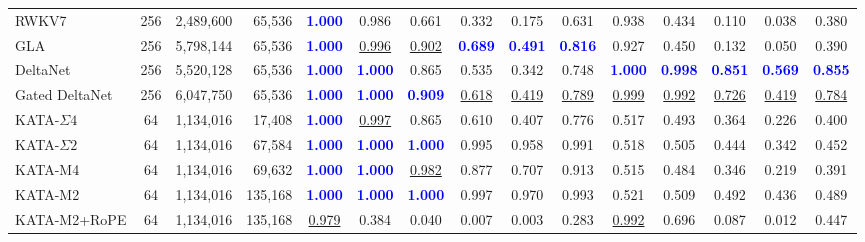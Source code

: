 \documentclass{article}
\newcommand{\1}{\bm{1}}
\theoremstyle{definition}
\begin{document}
\begin{table}[t]
\begin{tabular}{l|c|rr|cccccc|ccccc}
    \cmidrule(lr){1-13}
    RWKV7
      & 256 & 2{,}489{,}600 & 65{,}536
      & \textcolor{blue}{\textbf{1.000}} & 0.986 & 0.661 & 0.332 & 0.175 & 0.631
      & 0.938 & 0.434 & 0.110 & 0.038 & 0.380 \\
    GLA
      & 256 & 5{,}798{,}144 & 65{,}536
      & \textcolor{blue}{\textbf{1.000}} & \underline{0.996} & \underline{0.902} & \textcolor{blue}{\textbf{0.689}} & \textcolor{blue}{\textbf{0.491}} & \textcolor{blue}{\textbf{0.816}}
      & 0.927 & 0.450 & 0.132 & 0.050 & 0.390 \\
    DeltaNet
      & 256 & 5{,}520{,}128 & 65{,}536
      & \textcolor{blue}{\textbf{1.000}} & \textcolor{blue}{\textbf{1.000}} & 0.865 & 0.535 & 0.342 & 0.748
      & \textcolor{blue}{\textbf{1.000}} & \textcolor{blue}{\textbf{0.998}} & \textcolor{blue}{\textbf{0.851}} & \textcolor{blue}{\textbf{0.569}} & \textcolor{blue}{\textbf{0.855}} \\
    Gated DeltaNet
      & 256 & 6{,}047{,}750 & 65{,}536
      & \textcolor{blue}{\textbf{1.000}} & \textcolor{blue}{\textbf{1.000}} & \textcolor{blue}{\textbf{0.909}} & \underline{0.618} & \underline{0.419} & \underline{0.789}
      & \underline{0.999} & \underline{0.992} & \underline{0.726} & \underline{0.419} & \underline{0.784} \\
    \midrule
    KATA-$\Sigma4$
      & 64 & 1{,}134{,}016 & 17{,}408
      & \textcolor{blue}{\textbf{1.000}} & \underline{0.997} & 0.865 & 0.610 & 0.407 & 0.776
      & 0.517 & 0.493 & 0.364 & 0.226 & 0.400 \\
    KATA-$\Sigma2$
      & 64 & 1{,}134{,}016 & 67{,}584
      & \textcolor{blue}{\textbf{1.000}} & \textcolor{blue}{\textbf{1.000}} & \textcolor{blue}{\textbf{1.000}} & 0.995 & 0.958 & 0.991
      & 0.518 & 0.505 & 0.444 & 0.342 & 0.452 \\
    KATA-M4
      & 64 & 1{,}134{,}016 & 69{,}632
      & \textcolor{blue}{\textbf{1.000}} & \textcolor{blue}{\textbf{1.000}} & \underline{0.982} & 0.877 & 0.707 & 0.913
      & 0.515 & 0.484 & 0.346 & 0.219 & 0.391 \\
    KATA-M2
      & 64 & 1{,}134{,}016 & 135{,}168
      & \textcolor{blue}{\textbf{1.000}} & \textcolor{blue}{\textbf{1.000}} & \textcolor{blue}{\textbf{1.000}} & 0.997 & 0.970 & 0.993
      & 0.521 & 0.509 & 0.492 & 0.436 & 0.489 \\
    KATA-M2+RoPE
      & 64 & 1{,}134{,}016 & 135{,}168
      & \underline{0.979} & 0.384 & 0.040 & 0.007 & 0.003 & 0.283
      & \underline{0.992} & 0.696 & 0.087 & 0.012 & 0.447 \\

\end{tabular}
\end{table}
\end{document}
